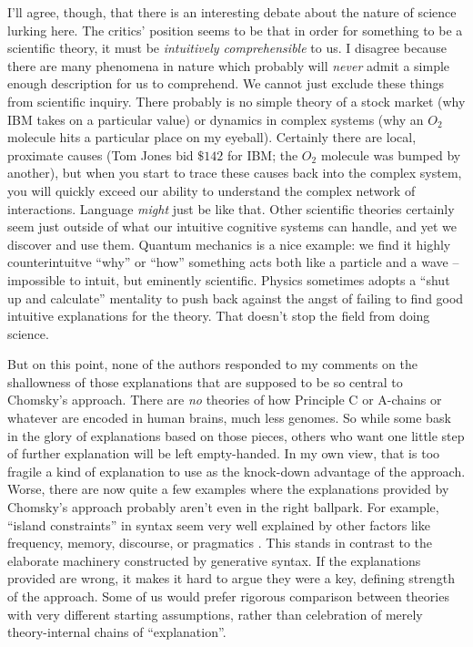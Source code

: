 \documentclass[output=paper,colorlinks,citecolor=brown]{langscibook}
\begin{document}
I'll agree, though, that there is an interesting debate about the nature of science lurking here. The critics' position seems to be that in order for something to be a scientific theory, it must be \textit{intuitively comprehensible} to us. I disagree because there are many phenomena in nature which probably will \textit{never} admit a simple enough description for us to comprehend. We cannot just exclude these things from scientific inquiry. There probably is no simple theory of a stock market (why IBM takes on a particular value) or dynamics in complex systems (why an $O_2$ molecule hits a particular place on my eyeball). Certainly there are local, proximate causes (Tom Jones bid $\$142$ for IBM; the $O_2$ molecule was bumped by another), but when you start to trace these causes back into the complex system, you will quickly exceed our ability to understand the complex network of interactions. Language \textit{might} just be like that. Other scientific theories certainly seem just outside of what our intuitive cognitive systems can handle, and yet we discover and use them. Quantum mechanics is a nice example: we find it highly counterintuitve ``why'' or ``how'' something acts both like a particle and a wave -- impossible to intuit, but eminently scientific. Physics sometimes adopts a ``shut up and calculate'' mentality \citep{david1989s} to push back against the angst of failing to find good intuitive explanations for the theory. That doesn't stop the field from doing science. 

But on this point, none of the authors responded to my comments on the shallowness of those explanations that are supposed to be so central to Chomsky's approach. There are \textit{no} theories of how Principle C or A-chains or whatever are encoded in human brains, much less genomes. So while some bask in the glory of explanations based on those pieces, others who want one little step of further explanation will be left empty-handed. In my own view, that is too fragile a kind of explanation to use as the knock-down advantage of the approach. Worse, there are now quite a few examples where the explanations provided by Chomsky's approach probably aren't even in the right ballpark. For example, ``island constraints'' in syntax seem very well explained by other factors like frequency, memory, discourse, or pragmatics \citep{kluender1992deriving,kluender1993subjacency,kehler2002coherence,chaves2020unbounded,goldberg2006constructions,liu2022structural,winckel2021french,ambridge2008island,abeille2020extraction,liu2022structural,liu2022verb,cuneo2023discourse}. This stands in contrast to the elaborate machinery constructed by generative syntax. If the explanations provided are wrong, it makes it hard to argue they were a key, defining strength of the approach. Some of us would prefer rigorous comparison between theories with very different starting assumptions, rather than celebration of merely theory-internal chains of ``explanation''.
\end{document}
